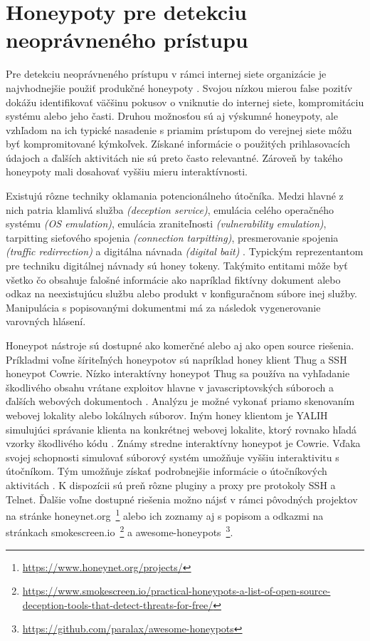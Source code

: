 \documentclass[conference, 11pt,slovak,a4paper,twoside]{IEEEtran}
\begin{document}
\section{Honeypoty pre detekciu neoprávneného prístupu} \label{honeypotsForIntrusionDetection}

Pre detekciu neoprávneného prístupu v rámci internej siete organizácie je najvhodnejšie použiť produkčné honeypoty \cite{jahankhani_analysis_2015}. Svojou nízkou mierou false pozitív dokážu identifikovať väčšinu pokusov o vniknutie do internej siete, kompromitáciu systému alebo jeho časti. Druhou možnosťou sú aj výskumné honeypoty, ale vzhľadom na ich typické nasadenie s priamim prístupom do verejnej siete môžu byť kompromitované kýmkoľvek. Získané informácie o použitých prihlasovacích údajoch a ďalších aktivitách nie sú preto často relevantné. Zároveň by takého honeypoty mali dosahovať vyššiu mieru interaktívnosti.

Existujú rôzne techniky oklamania potencionálneho útočníka. Medzi hlavné z nich patria klamlivá služba \emph{(deception service)}, emulácia celého operačného systému \emph{(OS emulation)}, emulácia zraniteľnosti \emph{(vulnerability emulation)}, tarpitting sieťového spojenia \emph{(connection tarpitting)}, presmerovanie spojenia \emph{(traffic redirrection)} a digitálna návnada \emph{(digital bait)} \cite{qassrawi_deception_2010}. Typickým reprezentantom pre techniku digitálnej návnady sú honey tokeny. Takýmito entitami môže byť všetko čo obsahuje falošné informácie \cite{qassrawi_deception_2010} ako napríklad fiktívny dokument alebo odkaz na neexistujúcu službu alebo produkt v konfiguračnom súbore inej služby. Manipulácia s popisovanými dokumentmi má za následok vygenerovanie varovných hlásení.

Honeypot nástroje sú dostupné ako komerčné alebo aj ako open source riešenia. Príkladmi voľne šíriteľných honeypotov sú napríklad honey klient Thug a SSH honeypot Cowrie. Nízko interaktívny honeypot Thug sa používa na vyhľadanie škodlivého obsahu vrátane exploitov hlavne v javascriptovských súboroch a ďalších webových dokumentoch \cite{zulkurnain_analysis_2018}. Analýzu je možné vykonať priamo skenovaním webovej lokality alebo lokálnych súborov. Iným honey klientom je YALIH simulujúci správanie klienta na konkrétnej webovej lokalite, ktorý rovnako hľadá vzorky škodlivého kódu \cite{mansoori_yalih_2014}. Známy stredne interaktívny honeypot je Cowrie. Vďaka svojej schopnosti simulovať súborový systém umožňuje vyššiu interaktivitu s útočníkom. Tým umožňuje získať podrobnejšie informácie o útočníkových aktivitách \cite{cabral_review_2019}. K dispozícii sú preň rôzne pluginy a proxy pre protokoly SSH a Telnet. Ďalšie voľne dostupné riešenia možno nájsť v rámci pôvodných projektov na stránke honeynet.org~\footnote{\url{https://www.honeynet.org/projects/}} alebo ich zoznamy aj s popisom a odkazmi na stránkach smokescreen.io~\footnote{\url{https://www.smokescreen.io/practical-honeypots-a-list-of-open-source-deception-tools-that-detect-threats-for-free/}}\cite{smokescreen_team_open_nodate} a awesome-honeypots~\footnote{\url{https://github.com/paralax/awesome-honeypots}}.
\end{document}
